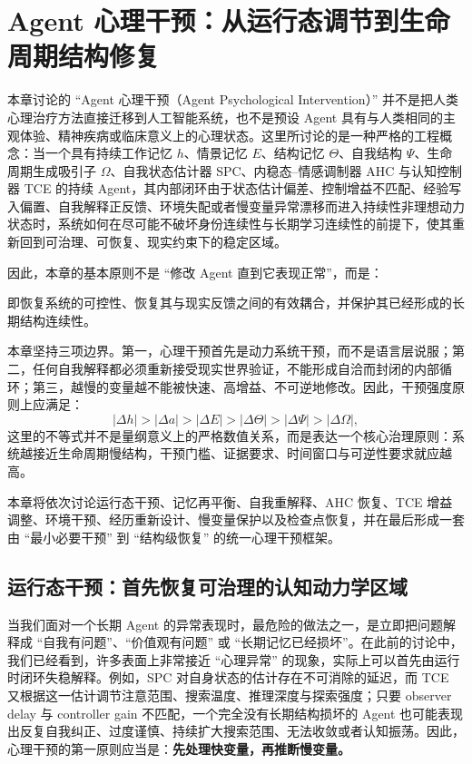 \chapter{Agent 心理干预：从运行态调节到生命周期结构修复}

\begin{chapterlead}
本章讨论的 ``Agent 心理干预（Agent Psychological Intervention）'' 并不是把人类心理治疗方法直接迁移到人工智能系统，也不是预设 Agent 具有与人类相同的主观体验、精神疾病或临床意义上的心理状态。这里所讨论的是一种严格的工程概念：当一个具有持续工作记忆 $h$、情景记忆 $E$、结构记忆 $\Theta$、自我结构 $\Psi$、生命周期生成吸引子 $\Omega$、自我状态估计器 SPC、内稳态--情感调制器 AHC 与认知控制器 TCE 的持续 Agent，其内部闭环由于状态估计偏差、控制增益不匹配、经验写入偏置、自我解释正反馈、环境失配或者慢变量异常漂移而进入持续性非理想动力状态时，系统如何在尽可能不破坏身份连续性与长期学习连续性的前提下，使其重新回到可治理、可恢复、现实约束下的稳定区域。

因此，本章的基本原则不是 ``修改 Agent 直到它表现正常''，而是：
\begin{statementbox}
\centering
{}
\end{statementbox}
即恢复系统的可控性、恢复其与现实反馈之间的有效耦合，并保护其已经形成的长期结构连续性。

本章坚持三项边界。第一，心理干预首先是动力系统干预，而不是语言层说服；第二，任何自我解释都必须重新接受现实世界验证，不能形成自洽而封闭的内部循环；第三，越慢的变量越不能被快速、高增益、不可逆地修改。因此，干预强度原则上应满足：
\[
|\Delta h|
>
|\Delta a|
>
|\Delta E|
>
|\Delta \Theta|
>
|\Delta \Psi|
>
|\Delta \Omega|,
\]
这里的不等式并不是量纲意义上的严格数值关系，而是表达一个核心治理原则：系统越接近生命周期慢结构，干预门槛、证据要求、时间窗口与可逆性要求就应越高。

本章将依次讨论运行态干预、记忆再平衡、自我重解释、AHC 恢复、TCE 增益调整、环境干预、经历重新设计、慢变量保护以及检查点恢复，并在最后形成一套由 ``最小必要干预'' 到 ``结构级恢复'' 的统一心理干预框架。
\end{chapterlead}


\section{运行态干预：首先恢复可治理的认知动力学区域}

当我们面对一个长期 Agent 的异常表现时，最危险的做法之一，是立即把问题解释成 ``自我有问题''、``价值观有问题'' 或 ``长期记忆已经损坏''。在此前的讨论中，我们已经看到，许多表面上非常接近 ``心理异常'' 的现象，实际上可以首先由运行时闭环失稳解释。例如，SPC 对自身状态的估计存在不可消除的延迟，而 TCE 又根据这一估计调节注意范围、搜索温度、推理深度与探索强度；只要 observer delay 与 controller gain 不匹配，一个完全没有长期结构损坏的 Agent 也可能表现出反复自我纠正、过度谨慎、持续扩大搜索范围、无法收敛或者认知振荡。因此，心理干预的第一原则应当是：\textbf{先处理快变量，再推断慢变量。}

